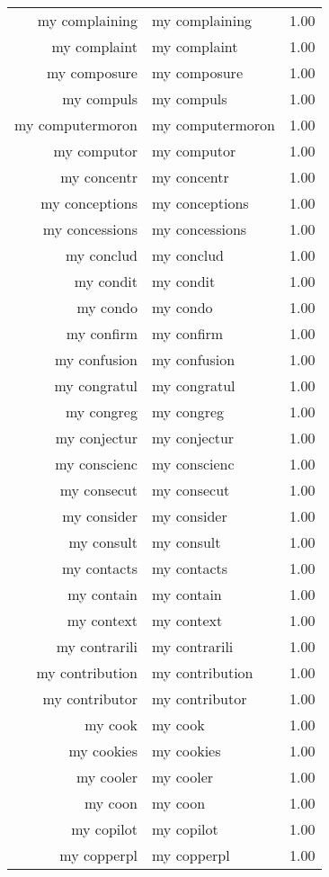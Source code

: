 \begin{table}[ht]
\begin{tabular}{rlr}
  my complaining & my complaining & 1.00 \\ 
  my complaint & my complaint & 1.00 \\ 
  my composure & my composure & 1.00 \\ 
  my compuls & my compuls & 1.00 \\ 
  my computermoron & my computermoron & 1.00 \\ 
  my computor & my computor & 1.00 \\ 
  my concentr & my concentr & 1.00 \\ 
  my conceptions & my conceptions & 1.00 \\ 
  my concessions & my concessions & 1.00 \\ 
  my conclud & my conclud & 1.00 \\ 
  my condit & my condit & 1.00 \\ 
  my condo & my condo & 1.00 \\ 
  my confirm & my confirm & 1.00 \\ 
  my confusion & my confusion & 1.00 \\ 
  my congratul & my congratul & 1.00 \\ 
  my congreg & my congreg & 1.00 \\ 
  my conjectur & my conjectur & 1.00 \\ 
  my conscienc & my conscienc & 1.00 \\ 
  my consecut & my consecut & 1.00 \\ 
  my consider & my consider & 1.00 \\ 
  my consult & my consult & 1.00 \\ 
  my contacts & my contacts & 1.00 \\ 
  my contain & my contain & 1.00 \\ 
  my context & my context & 1.00 \\ 
  my contrarili & my contrarili & 1.00 \\ 
  my contribution & my contribution & 1.00 \\ 
  my contributor & my contributor & 1.00 \\ 
  my cook & my cook & 1.00 \\ 
  my cookies & my cookies & 1.00 \\ 
  my cooler & my cooler & 1.00 \\ 
  my coon & my coon & 1.00 \\ 
  my copilot & my copilot & 1.00 \\ 
  my copperpl & my copperpl & 1.00 \\ 

\end{tabular}
\end{table}
